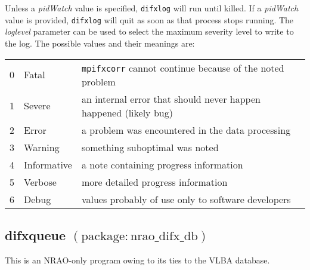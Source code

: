 Unless a {\em pidWatch} value is specified, {\tt difxlog} will run until killed.
If a {\em pidWatch} value is provided, {\tt difxlog} will quit as soon as that process stops running.
The {\em loglevel} parameter can be used to select the maximum severity level to write to the log.
The possible values and their meanings are:
\begin{center}
\begin{tabular}{lll}
0 & Fatal & {\tt mpifxcorr} cannot continue because of the noted problem \\
1 & Severe & an internal error that should never happen happened (likely bug) \\
2 & Error & a problem was encountered in the data processing \\
3 & Warning & something suboptimal was noted \\
4 & Informative & a note containing progress information \\
5 & Verbose & more detailed progress information \\
6 & Debug & values probably of use only to software developers \\
\end{tabular}
\end{center}








\subsection{difxqueue {\small $\mathrm{(package: nrao\_difx\_db)}$}} \label{sec:difxqueue}


This is an NRAO-only program owing to its ties to the VLBA database.


